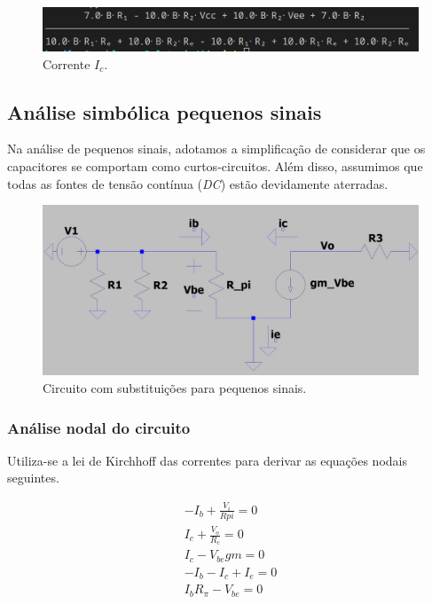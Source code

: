 \begin{figure}[H]
    \centering
    \includegraphics[width=0.7\columnwidth]{images/Ic}
    \caption{Corrente $I_c$.}
\end{figure}

\subsection{Análise simbólica pequenos sinais}

Na análise de pequenos sinais, adotamos a simplificação de considerar que os capacitores se comportam como curtos-circuitos. Além disso, assumimos que todas as fontes de tensão contínua (\emph{DC}) estão devidamente aterradas.

\begin{figure}[H]
    \centering
    \includegraphics[width=0.6\columnwidth]{images/circuito_pequenos_sinais.png}
    \caption{Circuito com substituições para pequenos sinais.}
    \label{fig:circuito_pequenos_sinais}
\end{figure}

\subsubsection{Análise nodal do circuito}

Utiliza-se a lei de Kirchhoff das correntes para derivar as equações nodais seguintes.

\begin{equation}
    \begin{aligned}
        - I_{b} + \frac{V_{i}}{Rpi} = 0 \\
        I_{c} + \frac{V_{o}}{R_{c}} = 0 \\
        I_{c} - V_{be} gm = 0           \\
        - I_{b} - I_{c} + I_{e} = 0     \\
        I_{b} R_{\pi} - V_{be} = 0
    \end{aligned}
    \label{eq:analise_nodal_pequenos_sinais}
\end{equation}

